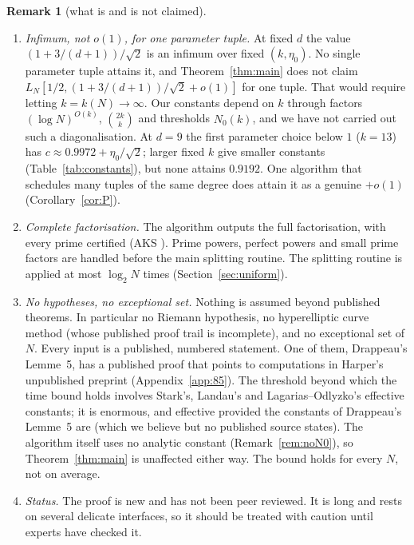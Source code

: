 \documentclass[11pt]{amsart}
\theoremstyle{definition}
\newtheorem{remark}[theorem]{Remark}
\begin{document}
\begin{remark}[what is and is not claimed]\label{rem:claims}
\begin{enumerate}[label=(\alph*)]
\item \emph{Infimum, not $o(1)$, for one parameter tuple.} At fixed $d$ the value $(1+3/(d+1))/\sqrt2$ is an infimum over fixed
  $(k,\eta_0)$. No single parameter tuple attains it, and Theorem~\ref{thm:main} does not claim $L_N[1/2,(1+3/(d+1))/\sqrt2+o(1)]$ for one
  tuple. That would require letting $k=k(N)\to\infty$. Our constants depend on $k$ through factors
  $(\log N)^{O(k)}$, $\binom{2k}{k}$ and thresholds $N_0(k)$, and we have not carried out such a
  diagonalisation. At $d=9$ the first parameter choice below $1$ ($k=13$) has $c\approx0.9972+\eta_0/\sqrt2$; larger fixed $k$ give smaller constants (Table~\ref{tab:constants}), but none attains $0.9192$.
  One algorithm that schedules many tuples of the same degree does attain it as a genuine $+o(1)$ (Corollary~\ref{cor:P}).
\item \emph{Complete factorisation.} The algorithm outputs the full factorisation, with every prime
  certified (AKS \cite{aks2004}). Prime powers, perfect powers and small prime factors are handled before the
  main splitting routine. The splitting routine is applied at most $\log_2N$ times
  (Section~\ref{sec:uniform}).
\item \emph{No hypotheses, no exceptional set.} Nothing is assumed beyond published theorems. In
  particular no Riemann hypothesis, no hyperelliptic curve method (whose published proof trail is
  incomplete), and no exceptional set of $N$. Every input is a published, numbered statement. One of them,
  Drappeau's Lemme~5, has a published proof that points to computations in Harper's unpublished preprint
  (Appendix~\ref{app:85}). The threshold beyond which the time bound holds involves Stark's, Landau's and
  Lagarias--Odlyzko's effective constants; it is enormous, and effective provided the constants of Drappeau's Lemme~5 are
  (which we believe but no published source states). The algorithm itself uses no analytic constant (Remark~\ref{rem:noN0}),
  so Theorem~\ref{thm:main} is unaffected either way. The bound holds for every $N$, not on average.
\item \emph{Status.} The proof is new and has not been peer reviewed. It is long and rests on several
  delicate interfaces, so it should be treated with caution until experts have checked it.
\end{enumerate}
\end{remark}
\end{document}
